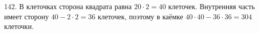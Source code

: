 142. В клеточках сторона квадрата равна $20\cdot2=40$ клеточек. Внутренняя часть имеет сторону $40-2\cdot2=36$ клеточек, поэтому в каёмке $40\cdot40-36\cdot36=304$ клеточки.\\
